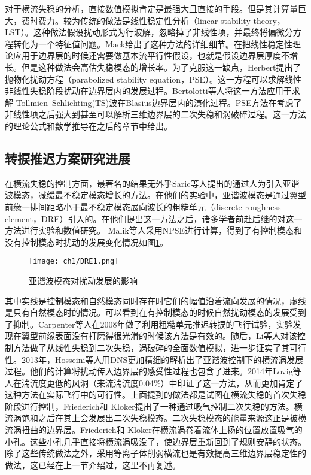 对于横流失稳的分析，直接数值模拟\cite{Wassermann2005,Bonfigli2007,Duan2013,Hosseini2013}肯定是最强大且直接的手段。但是其计算量巨大，费时费力。较为传统的做法是线性稳定性分析（linear stability theory，LST）。这种做法假设扰动形式为行波解，忽略掉了非线性项，并最终将偏微分方程转化为一个特征值问题。Mack\cite{Mack1984}给出了这种方法的详细细节。在把线性稳定性理论应用于边界层的时候还需要做基本流平行性假设，也就是假设边界层厚度不增长。但是这种做法会高估失稳模态的增长率。为了克服这一缺点，Herbert\cite{Herbert1987,Herbert1997,Herbert1993}提出了抛物化扰动方程（parabolized stability equation，PSE）。这一方程可以求解线性非线性失稳阶段扰动在边界层内的发展过程。Bertolotti等人\cite{Bertolotti1991,Bertolotti1992}将这一方法应用于求解 Tollmien--Schlichting(TS)波在Blasius边界层内的演化过程。PSE方法在考虑了非线性项之后强大到甚至可以解析三维边界层的二次失稳和涡破碎过程\cite{LiFei2011,Li2015a}。这一方法的理论公式和数学推导在之后的章节中给出。

\subsection{转捩推迟方案研究进展}
在横流失稳的控制方面，最著名的结果无外乎Saric\cite{Saric1998}等人提出的通过人为引入亚谐波模态，减缓最不稳定模态增长的方法。在他们的实验中，亚谐波模态是通过翼型前缘一排间距略小于最不稳定模态展向波长的粗糙单元（discrete roughness element，DRE）引入的。在他们提出这一方法之后，诸多学者前赴后继的对这一方法进行实验和数值研究\cite{Malik1999,Haynes2000,Wassermann2002,Carpenter2008,LiFei2011,Hosseini2013,Li2015a}。
Malik\cite{Malik1999}等人采用NPSE进行计算，得到了有控制模态和没有控制模态时扰动的发展变化情况如图\ref{f:DRE1}。
\begin{figure}
  \centering
  \texttt{[image: ch1/DRE1.png]}
  \caption{亚谐波模态对扰动发展的影响\cite{Malik1999}}\label{f:DRE1}
\end{figure}
其中实线是控制模态和自然模态同时存在时它们的幅值沿着流向发展的情况，虚线是只有自然模态时的情况。可以看到在有控制模态的时候自然扰动模态的发展受到了抑制。Carpenter\cite{Carpenter2008}等人在2008年做了利用粗糙单元推迟转捩的飞行试验，实验发现在翼型前缘表面没有打磨得很光滑的时候该方法是有效的。随后，Li等人\cite{Li2009roughness}对该控制方法做了从线性失稳到二次失稳，涡破碎的全面数值模拟，进一步证实了其可行性。2013年，Hosseini等人\cite{Hosseini2013}用DNS更加精细的解析出了亚谐波控制下的横流涡发展过程。他们的计算将扰动传入边界层的感受性过程也包含了进来。2014年Lovig等人\cite{Lovig2014}在湍流度更低的风洞（来流湍流度0.04\%）中印证了这一方法，从而更加肯定了这种方法在实际飞行中的可行性。上面提到的做法都是试图在横流失稳的首次失稳阶段进行控制，Friederich和 Kloker\cite{Friederich2011,Friederich2012}提出了一种通过吸气控制二次失稳的方法。横流涡饱和之后在其上会发展出二次失稳模态。二次失稳模态的能量来源这正是被横流涡扭曲的边界层。Friederich和 Kloker在横流涡卷着流体上扬的位置放置吸气的小孔。这些小孔几乎直接将横流涡吸没了，使边界层重新回到了规则安静的状态。除了这些传统做法之外，采用等离子体削弱横流也是有效提高三维边界层稳定性的做法\cite{dorr2016}，这已经在上一节介绍过，这里不再复述。



